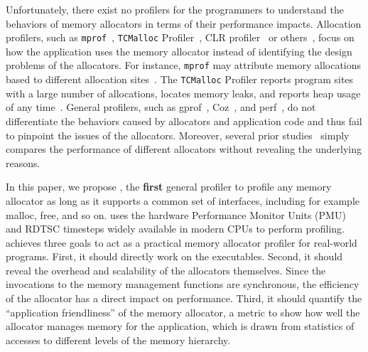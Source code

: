 Unfortunately, there exist no profilers for the programmers to understand the behaviors of memory allocators in terms of their performance impacts. Allocation profilers, such as \texttt{mprof}~\cite{Zorn:1988:MAP:894814}, \texttt{TCMalloc} Profiler~\cite{tcmalloc-profiler}, CLR profiler~\cite{lupasc2014dynamic} or others~\cite{hirotaka2003developing}, focus on how the application uses the memory allocator instead of identifying the design problems of the allocators. For instance, \texttt{mprof} may attribute memory allocations based to different allocation sites~\cite{Zorn:1988:MAP:894814}. The \texttt{TCMalloc} Profiler reports program sites with a large number of allocations, locates memory leaks, and reports heap usage of any time~\cite{tcmalloc-profiler}. General profilers, such as gprof~\cite{DBLP:conf/sigplan/GrahamKM82}, Coz~\cite{Coz}, and perf~\cite{perf}, do not differentiate the behaviors caused by allocators and application code and thus fail to pinpoint the issues of the allocators. Moreover, several prior studies~\cite{Barroso:1998:MSC:279358.279363, Masmano:2006:CMA:1167999.1168012, ferreira2011experimental} simply compares the performance of different allocators without revealing the underlying reasons. 


In this paper, we propose \MP{}, the \textbf{first} general profiler to profile any memory allocator as long as it supports a common set of interfaces, including for example malloc, free, and so on. \MP{} uses the hardware Performance Monitor Units (PMU) and RDTSC timesteps widely available in modern CPUs to perform profiling. \MP{} achieves three goals to act as a practical memory allocator profiler for real-world programs. First, it should directly work on the executables. Second, it should reveal the overhead and scalability of the allocators themselves. Since the invocations to the memory management functions are synchronous, the efficiency of the allocator has a direct impact on performance. Third, it should quantify the ``application friendliness'' of the memory allocator, a metric to show how well the allocator manages memory for the application, which is drawn from statistics of accesses to different levels of the memory hierarchy.

